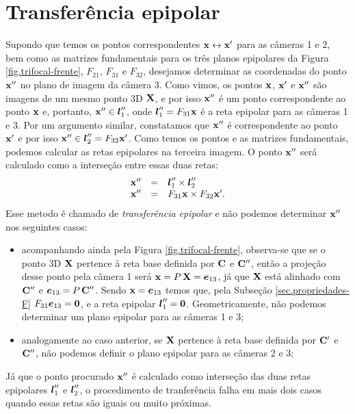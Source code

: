 \section{Transferência epipolar}\label{sec.trans-epipolar}
Supondo que temos os pontos correspondentes $\mathbf{x}\leftrightarrow\mathbf{x}'$ para as câmeras 1 e 2, bem como as matrizes fundamentais para os três planos epipolares da Figura \ref{fig.trifocal-frente}, $F_{21}$, $F_{31}$ e $F_{32}$, desejamos determinar as coordenadas do ponto $\mathbf{x}''$ no plano de imagem da câmera 3. Como vimos, os pontos $\mathbf{x}$, $\mathbf{x}'$ e $\mathbf{x}''$ são imagens de um mesmo ponto 3D $\mathbf{X}$, e por isso $\mathbf{x}''$ é um ponto correspondente ao ponto $\mathbf{x}$ e, portanto, $\mathbf{x}''\in\boldsymbol{l}''_1$, onde $\boldsymbol{l}''_1=F_{31}\mathbf{x}$ é a reta epipolar para as câmeras 1 e 3. Por um argumento similar, constatamos que $\mathbf{x}''$ é correspondente ao ponto $\mathbf{x}'$ e por isso $\mathbf{x}''\in\boldsymbol{l}''_2=F_{32}\mathbf{x}'$. Como temos os pontos e as matrizes fundamentais, podemos calcular as retas epipolares na terceira imagem. O ponto $\mathbf{x}''$ será calculado como a interseção entre essas duas retas:
\begin{equation}
\begin{array}{rcl}
\mathbf{x}''&=&\boldsymbol{l}''_1\times\boldsymbol{l}''_2\\
\mathbf{x}''&=&F_{31}\mathbf{x}\times F_{32}\mathbf{x}'.
\end{array}
\end{equation}
Esse metodo é chamado de {\it transferência epipolar} e não podemos determinar $\mathbf{x}''$ nos seguintes casos:
\begin{itemize}
\item acompanhando ainda pela Figura \ref{fig.trifocal-frente}, observa-se que se o ponto 3D $\mathbf{X}$ pertence à reta base definida por ${\bf C}$ e ${\bf C}''$, então a projeção desse ponto pela câmera 1 será $\mathbf{x}=P\,\mathbf{X}=\boldsymbol{e}_{13}$, já que $\mathbf{X}$ está alinhado com ${\bf C}''$ e $\boldsymbol{e}_{13}=P\,{\bf C}''$. Sendo $\mathbf{x}=\boldsymbol{e}_{13}$ temos que, pela Subseção \ref{sec.propriedades-F} $F_{31}\boldsymbol{e}_{13}={\bf 0}$, e a reta epipolar $\boldsymbol{l}''_1={\bf 0}$. Geometricamente, não podemos determinar um plano epipolar para as câmeras 1 e 3;
\item analogamente ao caso anterior, se $\mathbf{X}$ pertence à reta base definida por ${\bf C}'$ e ${\bf C}''$, não podemos definir o plano epipolar para as câmeras 2 e 3;\\
\end{itemize}

Já que o ponto procurado $\mathbf{x}''$ é calculado como interseção das duas retas epipolares $\boldsymbol{l}''_1$ e $\boldsymbol{l}''_2$, o procedimento de tranferência falha em mais dois casos quando essas retas são iguais ou muito próximas.


